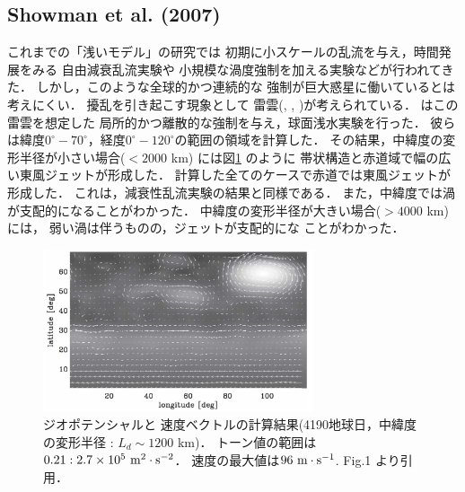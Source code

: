 \documentclass[a4j,12pt,openbib,oneside]{jreport}
\begin{document}
\subsection{Showman et al. (2007)}
\label{sec:intro21}
これまでの「浅いモデル」の研究では
初期に小スケールの乱流を与え，時間発展をみる
自由減衰乱流実験\citep{Yoden1993}や
小規模な渦度強制を加える実験\citep{Scott2007}などが行われてきた．
%
しかし，このような全球的かつ連続的な
強制が巨大惑星に働いているとは考えにくい．
%
擾乱を引き起こす現象として
雷雲(\cite{Gierasch2000}, \cite{Porco2005}, \cite{Ingersoll2000})が考えられている．
%
\cite{Showman2007}はこの雷雲を想定した
局所的かつ離散的な強制を与え，球面浅水実験を行った．
彼らは緯度$0^\circ - 70^\circ$，経度$0^\circ - 120^\circ$の範囲の領域を計算した．
その結果，中緯度の変形半径が小さい場合($< 2000$ km) には図\ref{fig3} のように
帯状構造と赤道域で幅の広い東風ジェットが形成した．
計算した全てのケースで赤道では東風ジェットが形成した．
これは，減衰性乱流実験の結果と同様である\citep{Cho1996}．
また，中緯度では渦が支配的になることがわかった．
%
中緯度の変形半径が大きい場合($> 4000$ km) には，
弱い渦は伴うものの，ジェットが支配的にな
ことがわかった．
%
%
\begin{figure}[H]
  \begin{center}
    \includegraphics[clip,width=8cm]{./fig/intro/fig3.png}
    \caption{
      \footnotesize{ジオポテンシャルと
速度ベクトルの計算結果(4190地球日，中緯度の変形半径 : $L_d \sim 1200$ km)．
トーン値の範囲は$0.21 : 2.7 \times 10^5 \rm{~m^2 \cdot s^{-2}}$．
速度の最大値は$96 \rm{~m \cdot s^{-1}}$.
\cite{Showman2007} Fig.1 より引用．
      }
    }
    \label{fig3}
  \end{center}
\end{figure}
%
\end{document}
